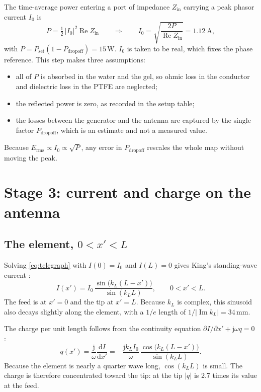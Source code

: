 \documentclass[11pt,a4paper]{article}
\newcommand{\dd}{\mathrm{d}}
\newcommand{\jj}{\mathrm{j}}
\newcommand{\Erms}{E_{\mathrm{rms}}}
\begin{document}
The time-average power entering a port of impedance $Z_{\text{in}}$ carrying a peak phasor current $I_0$ is
\cite{Pozar2012}
\begin{equation}
  P = \tfrac12\,|I_0|^2\operatorname{Re}Z_{\text{in}}
  \qquad\Rightarrow\qquad
  I_0 = \sqrt{\frac{2P}{\operatorname{Re}Z_{\text{in}}}} = 1.12\ \text{A},
  \label{eq:I0}
\end{equation}
with $P = P_{\text{set}}(1-P_{\text{dropoff}}) = 15$\,W. $I_0$ is taken to be real, which fixes the phase
reference. This step makes three assumptions:
\begin{itemize}
  \item all of $P$ is absorbed in the water and the gel, so ohmic loss in the conductor and dielectric loss
        in the PTFE are neglected;
  \item the reflected power is zero, as recorded in the setup table;
  \item the losses between the generator and the antenna are captured by the single factor
        $P_{\text{dropoff}}$, which is an estimate and not a measured value.
\end{itemize}
Because $\Erms\propto I_0\propto\sqrt{P}$, any error in $P_{\text{dropoff}}$ rescales the whole map without
moving the peak.

\section{Stage 3: current and charge on the antenna}\label{sec:sources}

\subsection{The element, $0<x'<L$}

Solving \eqref{eq:telegraph} with $I(0)=I_0$ and $I(L)=0$ gives King's standing-wave current
\cite{King1983,KingSmith1981}:
\begin{equation}
  I(x') = I_0\,\frac{\sin\!\big(k_L(L-x')\big)}{\sin(k_L L)}, \qquad 0<x'<L .
  \label{eq:Ielem}
\end{equation}
The feed is at $x'=0$ and the tip at $x'=L$. Because $k_L$ is complex, this sinusoid also decays slightly
along the element, with a $1/e$ length of $1/|\operatorname{Im}k_L|=34$\,mm.

The charge per unit length follows from the continuity equation
$\partial I/\partial x' + \jj\omega q = 0$ \cite{Jackson1999}:
\begin{equation}
  q(x') = \frac{\jj}{\omega}\frac{\dd I}{\dd x'}
        = -\frac{\jj k_L I_0}{\omega}\,\frac{\cos\!\big(k_L(L-x')\big)}{\sin(k_L L)}.
  \label{eq:qelem}
\end{equation}
Because the element is nearly a quarter wave long, $\cos(k_L L)$ is small. The charge is therefore
concentrated toward the tip: at the tip $|q|$ is 2.7 times its value at the feed.
\end{document}
